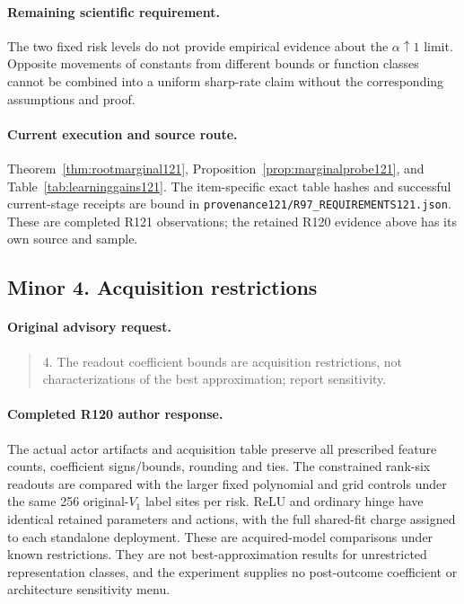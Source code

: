 \paragraph{Remaining scientific requirement.}
The two fixed risk levels do not provide empirical evidence about the $\alpha\uparrow1$ limit. Opposite movements of constants from different bounds or function classes cannot be combined into a uniform sharp-rate claim without the corresponding assumptions and proof.

\paragraph{Current execution and source route.}
Theorem~\ref{thm:rootmarginal121}, Proposition~\ref{prop:marginalprobe121}, and Table~\ref{tab:learninggains121}.
The item-specific exact table hashes and successful current-stage receipts are bound in \nolinkurl{provenance121/R97_REQUIREMENTS121.json}. These are completed R121 observations; the retained R120 evidence above has its own source and sample.

\subsection{Minor 4. Acquisition restrictions}
\label{response121:minor-4}

\paragraph{Original advisory request.}
\begin{quote}
4. The readout coefficient bounds are acquisition restrictions, not characterizations of the best approximation; report sensitivity.
\end{quote}

\paragraph{Completed R120 author response.}
The actual actor artifacts and acquisition table preserve all prescribed feature counts, coefficient signs/bounds, rounding and ties. The constrained rank-six readouts are compared with the larger fixed polynomial and grid controls under the same 256 original-$V_1$ label sites per risk. ReLU and ordinary hinge have identical retained parameters and actions, with the full shared-fit charge assigned to each standalone deployment. These are acquired-model comparisons under known restrictions. They are not best-approximation results for unrestricted representation classes, and the experiment supplies no post-outcome coefficient or architecture sensitivity menu.

